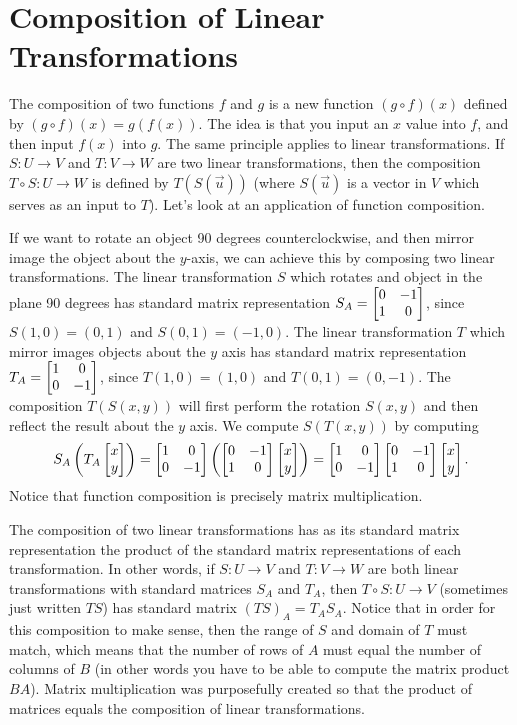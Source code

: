 \section{Composition of Linear Transformations}
The composition of two functions $f$ and $g$ is a new function $(g\circ f)(x)$ defined by $(g\circ f)(x) = g(f(x))$.  The idea is that you input an $x$ value into $f$, and then input $f(x)$ into $g$.  The same principle applies to linear transformations.  If $S:U\to V$ and $T:V\to W$ are two linear transformations, then the composition $T\circ S:U\to W$ is defined by $T(S(\vec u))$ (where $S(\vec u)$ is a vector in $V$ which serves as an input to $T$). Let's look at an application of function composition. 

\begin{example}
If we want to rotate an object 90 degrees counterclockwise, and then mirror image the object about the $y$-axis, we can achieve this by composing two linear transformations. 
The linear transformation $S$ which rotates and object in the plane 90 degrees has standard matrix representation $S_A = \begin{bmatrix} 0&-1\\1&0 \end{bmatrix}$, since $S(1,0) = (0,1)$ and $S(0,1)=(-1,0)$.  
The linear transformation $T$ which mirror images objects about the $y$ axis has standard matrix representation $T_A = \begin{bmatrix} 1&0\\0&-1 \end{bmatrix}$, since $T(1,0)=(1,0)$ and $T(0,1)=(0,-1)$.  The composition $T(S(x,y))$ will first perform the rotation $S(x,y)$ and then reflect the result about the $y$ axis. We compute $S(T(x,y))$ by computing 
$$S_A\left(T_A\begin{bmatrix} x\\y \end{bmatrix}\right) = \begin{bmatrix} 1&0\\0&-1 \end{bmatrix}\left(\begin{bmatrix} 0&-1\\1&0 \end{bmatrix}\begin{bmatrix} x\\y \end{bmatrix}\right) = \begin{bmatrix} 1&0\\0&-1 \end{bmatrix}\begin{bmatrix} 0&-1\\1&0 \end{bmatrix}\begin{bmatrix} x\\y \end{bmatrix}. $$
Notice that function composition is precisely matrix multiplication.
\end{example}


The composition of two linear transformations has as its standard matrix representation the product of the standard matrix representations of each transformation. 
In other words, if $S: U\to V$ and $T:V\to W$ are both linear transformations with standard matrices $S_A$ and $T_A$, then $T\circ S:U \to V$ (sometimes just written $TS$) has standard matrix $(TS)_A=T_AS_A$. 
Notice that in order for this composition to make sense, then the range of $S$ and domain of $T$ must match, which means that the number of rows of $A$ must equal the number of columns of $B$ (in other words you have to be able to compute the matrix product $BA$). 
Matrix multiplication was purposefully created so that the product of matrices equals the composition of linear transformations. 

